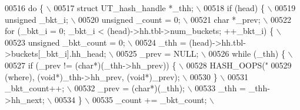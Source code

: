 \begin{DoxyCode}
{{{00516 \textcolor{preprocessor}{do \{                                                                             \(\backslash\)}
00517 \textcolor{preprocessor}{  struct UT\_hash\_handle *\_thh;                                                   \(\backslash\)}
00518 \textcolor{preprocessor}{  if (head) \{                                                                    \(\backslash\)}
00519 \textcolor{preprocessor}{    unsigned \_bkt\_i;                                                             \(\backslash\)}
00520 \textcolor{preprocessor}{    unsigned \_count = 0;                                                         \(\backslash\)}
00521 \textcolor{preprocessor}{    char *\_prev;                                                                 \(\backslash\)}
00522 \textcolor{preprocessor}{    for (\_bkt\_i = 0; \_bkt\_i < (head)->hh.tbl->num\_buckets; ++\_bkt\_i) \{           \(\backslash\)}
00523 \textcolor{preprocessor}{      unsigned \_bkt\_count = 0;                                                   \(\backslash\)}
00524 \textcolor{preprocessor}{      \_thh = (head)->hh.tbl->buckets[\_bkt\_i].hh\_head;                            \(\backslash\)}
00525 \textcolor{preprocessor}{      \_prev = NULL;                                                              \(\backslash\)}
00526 \textcolor{preprocessor}{      while (\_thh) \{                                                             \(\backslash\)}
00527 \textcolor{preprocessor}{        if (\_prev != (char*)(\_thh->hh\_prev)) \{                                   \(\backslash\)}
00528 \textcolor{preprocessor}{          HASH\_OOPS("%
00529 \textcolor{preprocessor}{              (where), (void*)\_thh->hh\_prev, (void*)\_prev);                      \(\backslash\)}
00530 \textcolor{preprocessor}{        \}                                                                        \(\backslash\)}
00531 \textcolor{preprocessor}{        \_bkt\_count++;                                                            \(\backslash\)}
00532 \textcolor{preprocessor}{        \_prev = (char*)(\_thh);                                                   \(\backslash\)}
00533 \textcolor{preprocessor}{        \_thh = \_thh->hh\_next;                                                    \(\backslash\)}
00534 \textcolor{preprocessor}{      \}                                                                          \(\backslash\)}
00535 \textcolor{preprocessor}{      \_count += \_bkt\_count;                                                      \(\backslash\)}
}}}}
\end{DoxyCode}
